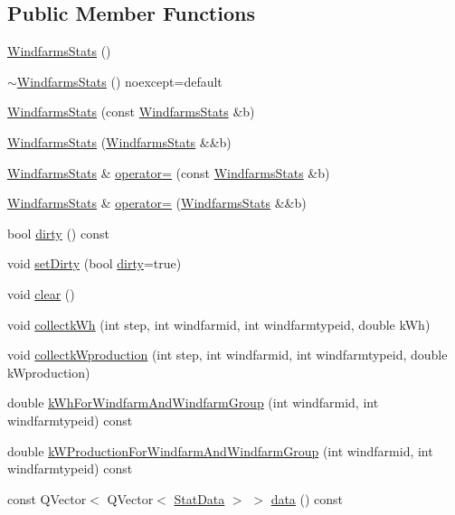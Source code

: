 \subsection*{Public Member Functions}
\begin{DoxyCompactItemize}
\item 
\mbox{\hyperlink{class_windfarms_stats_aba60bee523b07ba4ea4b202ea7229d23}{Windfarms\+Stats}} ()
\item 
\mbox{\hyperlink{class_windfarms_stats_a15f855267e9899e8643f928fc8798a74}{$\sim$\+Windfarms\+Stats}} () noexcept=default
\item 
\mbox{\hyperlink{class_windfarms_stats_afdd188df19fd0687a95718050c358ca9}{Windfarms\+Stats}} (const \mbox{\hyperlink{class_windfarms_stats}{Windfarms\+Stats}} \&b)
\item 
\mbox{\hyperlink{class_windfarms_stats_ae49cdf4b05fc25a2f64c080b282b1702}{Windfarms\+Stats}} (\mbox{\hyperlink{class_windfarms_stats}{Windfarms\+Stats}} \&\&b)
\item 
\mbox{\hyperlink{class_windfarms_stats}{Windfarms\+Stats}} \& \mbox{\hyperlink{class_windfarms_stats_a6fd140253a1cfc5e9996af30b18f9fc3}{operator=}} (const \mbox{\hyperlink{class_windfarms_stats}{Windfarms\+Stats}} \&b)
\item 
\mbox{\hyperlink{class_windfarms_stats}{Windfarms\+Stats}} \& \mbox{\hyperlink{class_windfarms_stats_ad13b12dc1467eb4472f5f9ec14160306}{operator=}} (\mbox{\hyperlink{class_windfarms_stats}{Windfarms\+Stats}} \&\&b)
\item 
bool \mbox{\hyperlink{class_windfarms_stats_ab6c5b16f34f3d3574d847990fa41d4d2}{dirty}} () const
\item 
void \mbox{\hyperlink{class_windfarms_stats_a1bfa4204e59fc94fdcdaa38b1c29ee0e}{set\+Dirty}} (bool \mbox{\hyperlink{class_windfarms_stats_ab6c5b16f34f3d3574d847990fa41d4d2}{dirty}}=true)
\item 
void \mbox{\hyperlink{class_windfarms_stats_aa73a7e08433af56befe5e7f993f8c8dd}{clear}} ()
\item 
void \mbox{\hyperlink{class_windfarms_stats_acde1e30aba3ca1f49f32a694f8696a16}{collectk\+Wh}} (int step, int windfarmid, int windfarmtypeid, double k\+Wh)
\item 
void \mbox{\hyperlink{class_windfarms_stats_add9ccf600833d4d2ac52f9ec4bb62ed1}{collectk\+Wproduction}} (int step, int windfarmid, int windfarmtypeid, double k\+Wproduction)
\item 
double \mbox{\hyperlink{class_windfarms_stats_aff9a8e302cfa6c735e480035bc333bdb}{k\+Wh\+For\+Windfarm\+And\+Windfarm\+Group}} (int windfarmid, int windfarmtypeid) const
\item 
double \mbox{\hyperlink{class_windfarms_stats_ae167ae1837e183c2d9e739b13ad2995c}{k\+W\+Production\+For\+Windfarm\+And\+Windfarm\+Group}} (int windfarmid, int windfarmtypeid) const
\item 
const Q\+Vector$<$ Q\+Vector$<$ \mbox{\hyperlink{struct_windfarms_stats_1_1_stat_data}{Stat\+Data}} $>$ $>$ \mbox{\hyperlink{class_windfarms_stats_aa8c4942f672303d9c3e46723c6d4d9da}{data}} () const
\end{DoxyCompactItemize}
